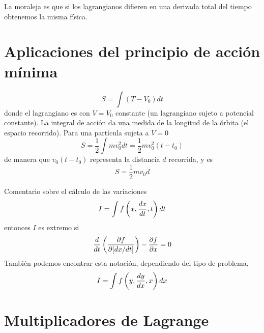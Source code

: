 \documentclass[10pt,oneside]{CBFT_article}
\begin{document}
La moraleja es que si los lagrangianos difieren en una derivada total del tiempo obtenemos la misma
física.

\section{Aplicaciones del principio de acción mínima}

\[
S = \int (T-V_0) dt
\]
donde el lagrangiano es con $V=V_0$ constante (un lagrangiano sujeto a potencial constante).
La integral de acción da una medida de la longitud de la órbita (el espacio recorrido).
Para una partícula sujeta a $V=0$
\[
S = \frac{1}{2}\int m v_0^2 dt = \frac{1}{2}mv_0^2(t-t_0)
\]
de manera que $v_0(t-t_0)$ representa la distancia $d$ recorrida, y es 
\[
S = \frac{1}{2}mv_0 d
\]

Comentario sobre el cálculo de las variaciones
\[
I = \int f\left(x, \frac{d^{\hspace{-0.05em}} {x}}{d {t}^{\hspace{-0.05em}}}, t\right) dt 
\]
entonces $I$ es extremo si
\[
\frac{d}{dt} \left( \frac{\partial^{\hspace{-0.05em}} {f}}{\partial {[dx/dt]}^{\hspace{-0.05em}}}\right) - \frac{\partial^{\hspace{-0.05em}} {f}}{\partial {x}^{\hspace{-0.05em}}} = 0
\]
También podemos encontrar esta notación, dependiendo del tipo de problema,
\[
I = \int f\left(y, \frac{d^{\hspace{-0.05em}} {y}}{d {x}^{\hspace{-0.05em}}}, x\right) dx 
\]


\section{Multiplicadores de Lagrange}





\end{document}
